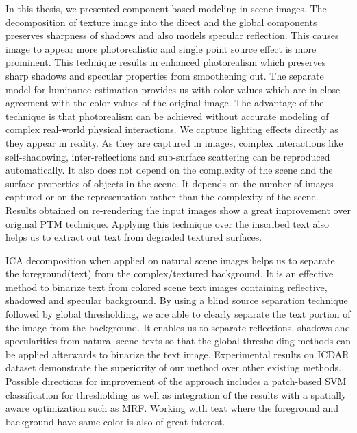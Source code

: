 In this thesis, we presented component based modeling in scene images. The decomposition
of texture image into the direct and the global components preserves sharpness of shadows and also models
specular reflection. This causes image to appear more photorealistic and single
point source effect is more prominent. This technique results in enhanced
photorealism which preserves sharp shadows and specular properties from
smoothening out. The separate model for luminance estimation provides us with
color values which are in close agreement with the color values of the original
image. The advantage of the technique is that photorealism can be achieved 
without accurate modeling of complex real-world physical interactions. We capture
lighting effects directly as they appear in reality. As they are captured in images, complex
interactions like self-shadowing, inter-reflections and sub-surface scattering can be reproduced automatically. It also does not
depend on the complexity of the scene and the surface properties of objects in the scene. 
It depends on the number of images captured or on the representation rather than the complexity of the scene. 
Results obtained on re-rendering the input images show a great
improvement over original PTM technique. Applying this technique over the inscribed text also helps us to extract
out text from degraded textured surfaces.

ICA decomposition when applied on natural scene images helps us to separate the foreground(text) from the complex/textured background.
It is an effective method to binarize text from colored scene text images containing reflective, shadowed and specular
background. By using a blind source separation technique followed by global thresholding, we are able to clearly separate
the text portion of the image from the background. It enables us to separate reflections, shadows and 
specularities from natural scene texts so that the global thresholding methods can be applied afterwards to binarize the 
text image. Experimental results on ICDAR dataset demonstrate the superiority of our method over other existing methods. 
Possible directions for improvement of the approach includes a patch-based SVM classification for thresholding as well
as integration of the results with a spatially aware optimization such as MRF. Working with text where the foreground and
background have same color is also of great interest.
 
